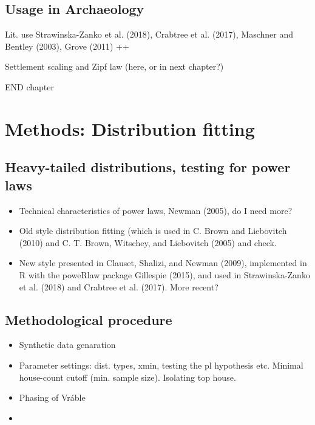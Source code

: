 \documentclass[
  12pt,
]{book}
\begin{document}
\hypertarget{usage-in-archaeology}{%
\section{Usage in Archaeology}\label{usage-in-archaeology}}

Lit. use Strawinska-Zanko et al. (2018), Crabtree et al. (2017), Maschner and Bentley (2003), Grove (2011) ++

Settlement scaling and Zipf law (here, or in next chapter?)

END chapter

\hypertarget{methods-distribution-fitting}{%
\chapter{Methods: Distribution fitting}\label{methods-distribution-fitting}}

\hypertarget{heavy-tailed-distributions-testing-for-power-laws}{%
\section{Heavy-tailed distributions, testing for power laws}\label{heavy-tailed-distributions-testing-for-power-laws}}

\begin{itemize}
\item
  Technical characteristics of power laws, Newman (2005), do I need more?
\item
  Old style distribution fitting (which is used in C. Brown and Liebovitch (2010) and C. T. Brown, Witschey, and Liebovitch (2005) and check.
\item
  New style presented in Clauset, Shalizi, and Newman (2009), implemented in R with the poweRlaw package Gillespie (2015), and used in Strawinska-Zanko et al. (2018) and Crabtree et al. (2017). More recent?
\end{itemize}

\hypertarget{methodological-procedure}{%
\section{Methodological procedure}\label{methodological-procedure}}

\begin{itemize}
\item
  Synthetic data genaration
\item
  Parameter settings: dist. types, xmin, testing the pl hypothesis etc. Minimal house-count cutoff (min. sample size). Isolating top house.
\item
  Phasing of Vráble
\item
\end{itemize}
\end{document}
